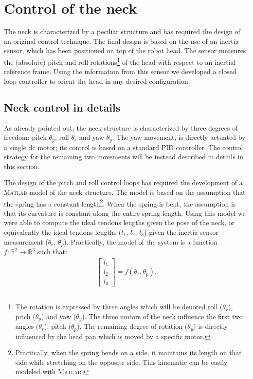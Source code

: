 \section{Control of the neck}

The neck is characterized by a peciliar structure and has required the design of an original control technique. The final design is based on the use of an inertia sensor, which has been positioned on top of the robot head. The sensor measures the (absolute) pitch and roll rotations\footnote{The rotation is expressed by three angles which will be denoted roll ($\theta_r$), pitch ($\theta_p$) and yaw ($\theta_y$). The three motors of the neck influence the first two angles ($\theta_r$), pitch ($\theta_p$). The remaining degree of rotation ($\theta_y$) is directly influenced by the head pan which is moved by a specific motor.} of the head with respect to an inertial reference frame. Using the information from this sensor we developed a closed loop controller to orient the head in any desired configuration. 

\subsection{Neck control in details}

As already pointed out, the neck structure is characterized by three degrees of freedom: pitch $\theta_p$, roll $\theta_r$ and yaw $\theta_y$. The yaw movement, is directly actuated by a single dc motor; its control is based on a standard PID controller. The control strategy for the remaining two movements will be instead described in details in this section.

The design of the pitch and roll control loops has required the development of a \textsc{Matlab} model of the neck structure. The model is based on the assumption that the spring has a constant length\footnote{Practically, when the spring bends on a side, it maintains its length on that side while stretching on the opposite side. This kinematic can be easily modeled with \textsc{Matlab}.}. When the spring is bent, the assumption is that its curvature is constant along the entire spring length. Using this model we were able to compute the ideal tendons lengths given the pose of the neck, or equivalently the ideal tendons lengths ($l_1$, $l_2$, $l_3$) given the inertia sensor measurement ($\theta_r$, $\theta_p$). Practically, the model of the system is a function $f: \mathbb R^2 \longrightarrow \mathbb R^3$ such that:
\begin{eqnarray} \label{Eq:Model_neck}
\begin{bmatrix}
l_1\\
l_2\\
l_3
\end{bmatrix} = f (\theta_r, \theta_p).
\end{eqnarray}

